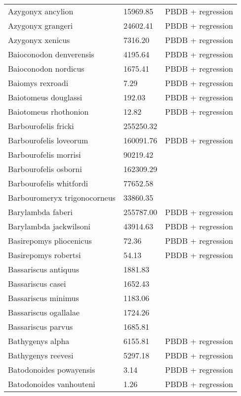 \documentclass{article}
\begin{document}
\begin{center}
\begin{longtable}{p{} p{} p{} }
  Azygonyx ancylion & 15969.85 & PBDB + regression \\ 
  Azygonyx grangeri & 24602.41 & PBDB + regression \\ 
  Azygonyx xenicus & 7316.20 & PBDB + regression \\ 
  Baioconodon denverensis & 4195.64 & PBDB + regression \\ 
  Baioconodon nordicus & 1675.41 & PBDB + regression \\ 
  Baiomys rexroadi & 7.29 & PBDB + regression \\ 
  Baiotomeus douglassi & 192.03 & PBDB + regression \\ 
  Baiotomeus rhothonion & 12.82 & PBDB + regression \\ 
  Barbourofelis fricki & 255250.32 & \cite{Tomiya2013} \\ 
  Barbourofelis loveorum & 160091.76 & PBDB + regression \\ 
  Barbourofelis morrisi & 90219.42 & \cite{Tomiya2013} \\ 
  Barbourofelis osborni & 162309.29 & \cite{Martin2002a} \\ 
  Barbourofelis whitfordi & 77652.58 & \cite{Tomiya2013} \\ 
  Barbouromeryx trigonocorneus & 33860.35 & \cite{Tomiya2013} \\ 
  Barylambda faberi & 255787.00 & PBDB + regression \\ 
  Barylambda jackwilsoni & 43914.63 & PBDB + regression \\ 
  Basirepomys pliocenicus & 72.36 & PBDB + regression \\ 
  Basirepomys robertsi & 54.13 & PBDB + regression \\ 
  Bassariscus antiquus & 1881.83 & \cite{Tomiya2013} \\ 
  Bassariscus casei & 1652.43 & \cite{Tomiya2013} \\ 
  Bassariscus minimus & 1183.06 & \cite{Robinson1966} \\ 
  Bassariscus ogallalae & 1724.26 & \cite{Gidley1920} \\ 
  Bassariscus parvus & 1685.81 & \cite{Tomiya2013} \\ 
  Bathygenys alpha & 6155.81 & PBDB + regression \\ 
  Bathygenys reevesi & 5297.18 & PBDB + regression \\ 
  Batodonoides powayensis & 3.14 & PBDB + regression \\ 
  Batodonoides vanhouteni & 1.26 & PBDB + regression \\ 

\end{longtable}
\end{center}
\end{document}
